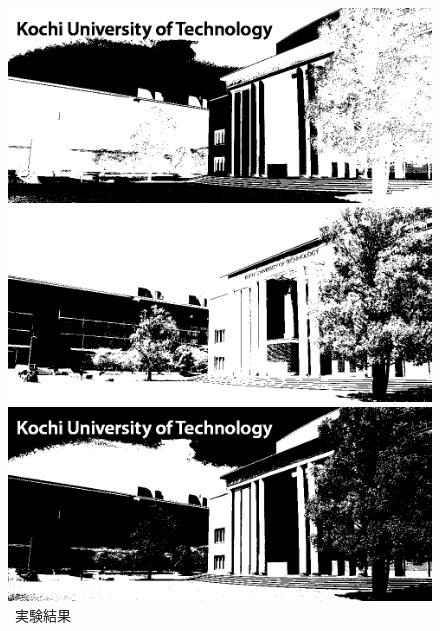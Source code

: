 \begin{figure}[h]
\begin{minipage}[b]{.23\textwidth}
    \end{minipage}
    \begin{minipage}[b]{.23\textwidth}
        \centering
        \includegraphics[keepaspectratio,width=\textwidth]{../../Figures/05_34_1.png}
    \end{minipage}
    \caption{\kadaiac\ 実験結果}
    \vsp
    \begin{minipage}[b]{.7\textwidth}
        \centering
        \begin{minipage}[b]{.3\textwidth}
            \centering
            \includegraphics[keepaspectratio,width=\textwidth]{../../Figures/05_41.png}
        \end{minipage}
        \begin{minipage}[b]{.3\textwidth}
            \centering
            \includegraphics[keepaspectratio,width=\textwidth]{../../Figures/05_42.png}

\end{minipage}
\end{minipage}
\end{figure}
